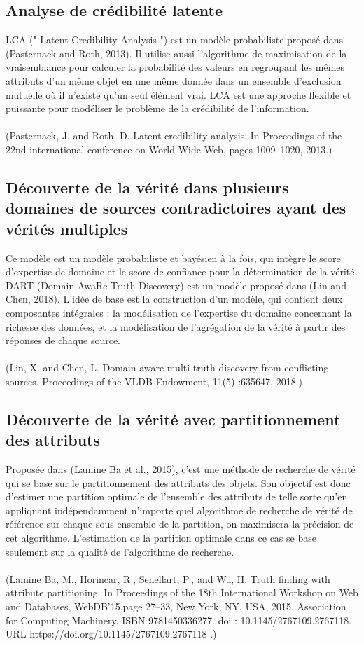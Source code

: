 \documentclass[12pt]{report}
\begin{document}
\subsection{Analyse de crédibilité latente}

LCA (" Latent Credibility Analysis ") est un modèle probabiliste proposé
dans (Pasternack and Roth, 2013). Il utilise aussi l’algorithme de
maximisation de la vraisemblance pour calculer la probabilité des valeurs
en regroupant les mêmes attributs d’un même objet en une même donnée
dans un ensemble d’exclusion mutuelle où il n’existe qu’un seul élément
vrai. LCA est une approche flexible et puissante pour modéliser le
problème de la crédibilité de l’information.
\\ \\(Pasternack, J. and Roth, D. Latent credibility analysis. In Proceedings of
the 22nd international conference on World Wide Web, pages 1009–1020,
2013.)

\subsection{Découverte de la vérité dans plusieurs domaines de sources contradictoires ayant des vérités multiples}

Ce modèle est un modèle probabiliste et bayésien à la fois, qui intègre le
score d’expertise de domaine et le score de confiance pour la
détermination de la vérité. DART (Domain AwaRe Truth Discovery) est un
modèle proposé dans (Lin and Chen, 2018). L’idée de base est la
construction d’un modèle, qui contient deux composantes intégrales : la
modélisation de l’expertise du domaine concernant la richesse des
données, et la modélisation de l’agrégation de la vérité à partir des
réponses de chaque source.
\\ \\(Lin, X. and Chen, L. Domain-aware multi-truth discovery from
conflicting sources. Proceedings of the VLDB Endowment, 11(5) :635647,
2018.)

\subsection{Découverte de la vérité avec partitionnement des attributs}

Proposée dans (Lamine Ba et al., 2015), c’est une méthode de recherche de
vérité qui se base sur le partitionnement des attributs des objets. Son
objectif est donc d’estimer une partition optimale de l’ensemble des
attributs de telle sorte qu’en appliquant indépendamment n’importe quel
algorithme de recherche de vérité de référence sur chaque sous ensemble
de la partition, on maximisera la précision de cet algorithme. L’estimation
de la partition optimale dans ce cas se base seulement sur la qualité de
l’algorithme de recherche.
\\ \\(Lamine Ba, M., Horincar, R., Senellart, P., and Wu, H. Truth finding with
attribute partitioning. In Proceedings of the 18th International Workshop
on Web and Databases, WebDB’15,page 27–33, New York, NY, USA,
2015. Association for Computing Machinery. ISBN 9781450336277. doi :
10.1145/2767109.2767118. URL https://doi.org/10.1145/2767109.2767118
.)
\end{document}
